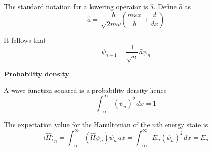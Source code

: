 \documentclass[12pt]{article}
\begin{document}
\noindent
The standard notation for a lowering operator is $\hat{a}$.
Define $\hat{a}$ as
\begin{equation*}
\hat{a}=\sqrt\frac{\hbar}{2m\omega}\left(\frac{m\omega x}{\hbar}+\frac{d}{dx}\right)
\end{equation*}

\noindent
It follows that
\begin{equation*}
\psi_{n-1}=\frac{1}{\sqrt n}\,\hat{a}\psi_n
\end{equation*}

\bigskip
\noindent
{\bf Probability density}

\bigskip
\noindent
A wave function squared is a probability density hence
\begin{equation*}
\int_{-\infty}^\infty (\psi_n)^2\,dx=1
\end{equation*}

\noindent
The expectation value for the Hamiltonian of the $n$th energy state is
\begin{equation*}
\langle\hat{H}\rangle_n=\int_{-\infty}^\infty(\hat{H}\psi_n)\psi_n\,dx
=\int_{-\infty}^\infty E_n(\psi_n)^2\,dx=E_n
\end{equation*}
\end{document}
